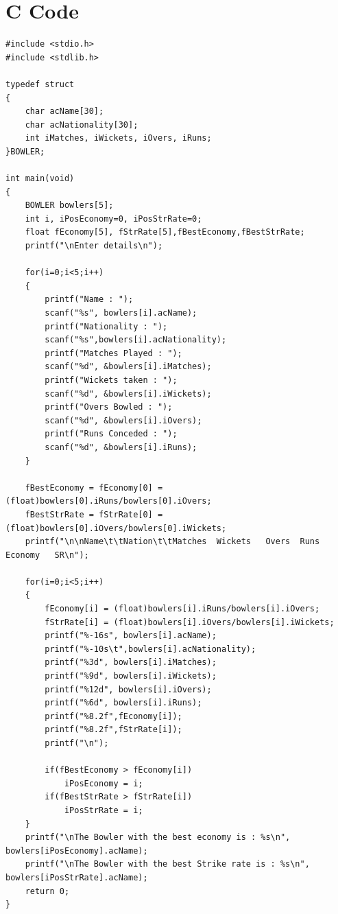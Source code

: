 \documentclass[a4paper]{report}
\begin{document}
\section*{C Code}
\begin{Verbatim}
#include <stdio.h>
#include <stdlib.h>

typedef struct
{
    char acName[30];
    char acNationality[30];
    int iMatches, iWickets, iOvers, iRuns;
}BOWLER;

int main(void)
{
    BOWLER bowlers[5];
    int i, iPosEconomy=0, iPosStrRate=0;
    float fEconomy[5], fStrRate[5],fBestEconomy,fBestStrRate;
    printf("\nEnter details\n");

    for(i=0;i<5;i++)
    {
        printf("Name : ");
        scanf("%s", bowlers[i].acName);
        printf("Nationality : ");
        scanf("%s",bowlers[i].acNationality);
        printf("Matches Played : ");
        scanf("%d", &bowlers[i].iMatches);
        printf("Wickets taken : ");
        scanf("%d", &bowlers[i].iWickets);
        printf("Overs Bowled : ");
        scanf("%d", &bowlers[i].iOvers);
        printf("Runs Conceded : ");
        scanf("%d", &bowlers[i].iRuns);
    }

    fBestEconomy = fEconomy[0] = (float)bowlers[0].iRuns/bowlers[0].iOvers;
    fBestStrRate = fStrRate[0] = (float)bowlers[0].iOvers/bowlers[0].iWickets;
    printf("\n\nName\t\tNation\t\tMatches  Wickets   Overs  Runs  Economy   SR\n");

    for(i=0;i<5;i++)
    {
        fEconomy[i] = (float)bowlers[i].iRuns/bowlers[i].iOvers;
        fStrRate[i] = (float)bowlers[i].iOvers/bowlers[i].iWickets;
        printf("%-16s", bowlers[i].acName);
        printf("%-10s\t",bowlers[i].acNationality);
        printf("%3d", bowlers[i].iMatches);
        printf("%9d", bowlers[i].iWickets);
        printf("%12d", bowlers[i].iOvers);
        printf("%6d", bowlers[i].iRuns);
        printf("%8.2f",fEconomy[i]);
        printf("%8.2f",fStrRate[i]);
        printf("\n");

        if(fBestEconomy > fEconomy[i])
            iPosEconomy = i;
        if(fBestStrRate > fStrRate[i])
            iPosStrRate = i;
    }
    printf("\nThe Bowler with the best economy is : %s\n", bowlers[iPosEconomy].acName);
    printf("\nThe Bowler with the best Strike rate is : %s\n", bowlers[iPosStrRate].acName);
    return 0;
}

\end{Verbatim}

\pagebreak
\end{document}
